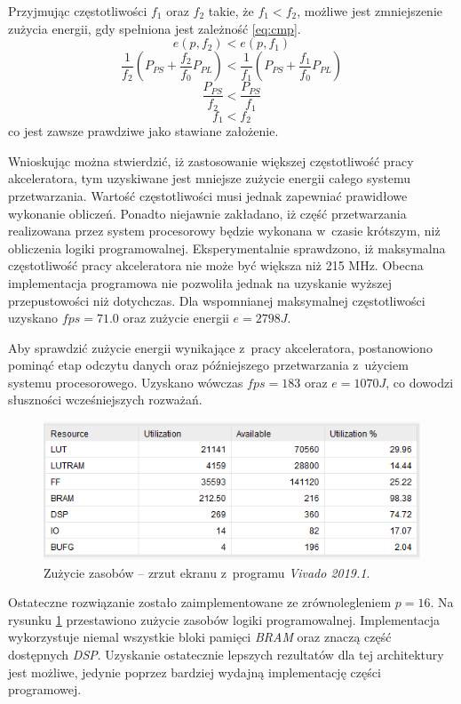 Przyjmując częstotliwości $f_1$ oraz $f_2$ takie, że $f_1 < f_2$, możliwe jest zmniejszenie zużycia energii, gdy spełniona jest zależność \eqref{eq:cmp}.
\begin{equation}
e(p, f_2) < e(p,f_1)
\label{eq:cmp}
\end{equation}
\begin{equation}
\frac{1}{f_2}(P_{PS} + \frac{f_2}{f_0} P_{PL}) < 
\frac{1}{f_1}(P_{PS} + \frac{f_1}{f_0} P_{PL})
\end{equation}
\begin{equation}
\frac{P_{PS}}{f_2} < 
\frac{P_{PS}}{f_1}
\end{equation}
\begin{equation}
f_1 < f_2
\end{equation}
co jest zawsze prawdziwe jako stawiane założenie.

Wnioskując można stwierdzić, iż zastosowanie większej częstotliwość pracy akceleratora, tym uzyskiwane jest mniejsze zużycie energii całego systemu przetwarzania.
Wartość częstotliwości musi jednak zapewniać prawidłowe wykonanie obliczeń.
Ponadto niejawnie zakładano, iż część przetwarzania realizowana przez system procesorowy będzie wykonana w~czasie krótszym, niż obliczenia logiki programowalnej.
Eksperymentalnie sprawdzono, iż maksymalna częstotliwość pracy akceleratora nie może być większa niż 215 MHz.
Obecna implementacja programowa nie pozwoliła jednak na uzyskanie wyższej przepustowości niż dotychczas.
Dla wspomnianej maksymalnej częstotliwości uzyskano $fps = 71.0$ oraz zużycie energii $e = 2798 J$.

Aby sprawdzić zużycie energii wynikające z~pracy akceleratora, postanowiono pominąć etap odczytu danych oraz późniejszego przetwarzania z~użyciem systemu procesorowego.
Uzyskano wówczas $fps = 183 $ oraz $e = 1070 J$, co dowodzi słuszności wcześniejszych rozważań.
 
 
\begin{figure}
    \centering
    \includegraphics[width=0.9\linewidth]{images/zasoby.png}
    \caption{Zużycie zasobów -- zrzut ekranu z~programu \emph{Vivado 2019.1}.}
    \label{fig:resources}
\end{figure}

Ostateczne rozwiązanie zostało zaimplementowane ze zrównolegleniem $p = 16$.
Na rysunku \ref{fig:resources} przestawiono zużycie zasobów logiki programowalnej.
Implementacja wykorzystuje niemal wszystkie bloki pamięci \emph{BRAM} oraz znaczą część dostępnych \emph{DSP}.
Uzyskanie ostatecznie lepszych rezultatów dla tej architektury jest możliwe, jedynie poprzez bardziej wydajną implementację części programowej.



